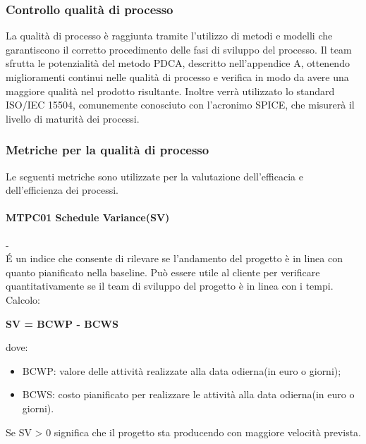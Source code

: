 \subsubsection{Controllo qualità di processo}
La qualità di processo è raggiunta tramite l'utilizzo di metodi e modelli che garantiscono il corretto procedimento delle fasi di sviluppo del processo. Il team sfrutta le potenzialità del metodo PDCA, descritto nell'appendice A, ottenendo miglioramenti continui nelle qualità di processo e verifica in modo da avere una maggiore qualità nel prodotto risultante. Inoltre verrà utilizzato lo standard ISO/IEC 15504, comunemente conosciuto con l'acronimo SPICE, che misurerà il livello di maturità dei processi.

\subsubsection{Metriche per la qualità di processo}
Le seguenti metriche sono utilizzate per la valutazione dell'efficacia e dell'efficienza dei processi.

\paragraph{MTPC01 Schedule Variance(SV)}\--\\
\'E un indice che consente di rilevare se l'andamento del progetto è in linea con quanto pianificato nella baseline\glossario. Può essere utile al cliente per verificare quantitativamente se il team di sviluppo del progetto è in linea con i tempi. \-\\
Calcolo:\-\\
\begin{center}
	\item \textbf{SV = BCWP - BCWS}
\end{center}
dove:
\begin{itemize}
	\item BCWP: valore delle attività realizzate alla data odierna(in euro o giorni);
	\item BCWS: costo pianificato per realizzare le attività alla data odierna(in euro o giorni).
\end{itemize}
Se SV > 0 significa che il progetto sta producendo con maggiore velocità prevista.


